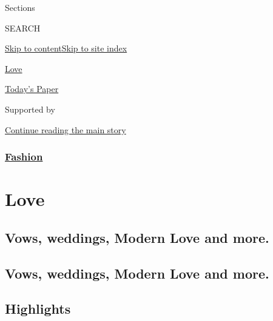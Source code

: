 Sections

SEARCH

\protect\hyperlink{site-content}{Skip to
content}\protect\hyperlink{site-index}{Skip to site index}

\href{https://www.nytimes3xbfgragh.onion/section/fashion/weddings}{Love}

\href{https://myaccount.nytimes3xbfgragh.onion/auth/login?response_type=cookie\&client_id=vi}{}

\href{https://www.nytimes3xbfgragh.onion/section/todayspaper}{Today's
Paper}

Supported by

\protect\hyperlink{after-sponsor}{Continue reading the main story}

\hypertarget{fashion}{%
\subsubsection{\texorpdfstring{\href{/section/fashion}{Fashion}}{Fashion}}\label{fashion}}

\hypertarget{love}{%
\section{Love}\label{love}}

\hypertarget{vows-weddings-modern-love-and-more}{%
\subsection{Vows, weddings, Modern Love and
more.}\label{vows-weddings-modern-love-and-more}}

\hypertarget{vows-weddings-modern-love-and-more-1}{%
\subsection{Vows, weddings, Modern Love and
more.}\label{vows-weddings-modern-love-and-more-1}}

\hypertarget{highlights}{%
\subsection{Highlights}\label{highlights}}


